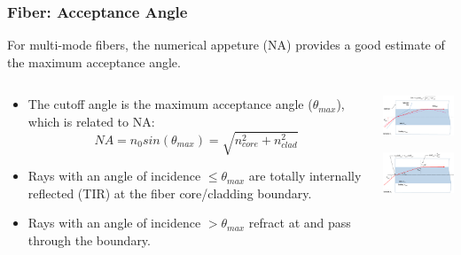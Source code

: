 \documentclass{beamer}
\begin{document}
\begin{frame}\frametitle{Fiber: Acceptance Angle}
For multi-mode fibers, the numerical appeture (NA) provides  a good estimate of the maximum acceptance angle. 
\begin{columns}
\begin{column}{7cm}


\begin{itemize}
\item The cutoff angle is the maximum acceptance angle ($\theta_{max}$), which is related to NA:
\[ NA = n_0 sin(\theta_{max}) = \sqrt{n_{core}^2 + n_{clad}^2} \]

\item Rays with an angle of incidence $\leq \theta_{max}$ are totally internally reflected (TIR) at the fiber core/cladding boundary.

\item Rays with an angle of incidence $> \theta_{max}$ refract at and pass through the boundary.

\end{itemize}

\end{column}
\begin{column}{4cm}
\begin{center}

\includegraphics[width=3.8cm]{fig/fiber_NA.png}

\vspace{0.25cm}

\includegraphics[width=3.8cm]{fig/fiber_TIR.png}

\end{center}
\end{column}
\end{columns}
\end{frame}
\end{document}
